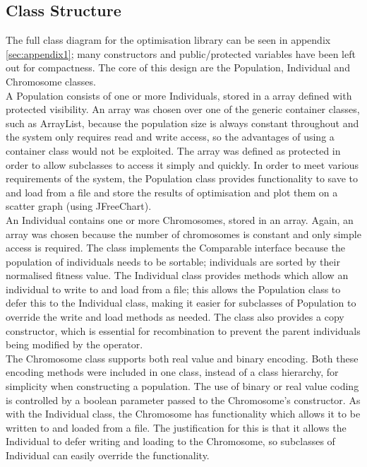 \subsection{Class Structure}
The full class diagram for the optimisation library can be seen in appendix \ref{sec:appendix1}; many constructors and public/protected variables have been left out for compactness. The core of this design are the Population, Individual and Chromosome classes.
\\A Population consists of one or more Individuals, stored in a array defined with protected visibility. An array was chosen over one of the generic container classes, such as ArrayList, because the population size is always constant throughout and the system only requires read and write access, so the advantages of using a container class would not be exploited. The array was defined as protected in order to allow subclasses to access it simply and quickly. In order to meet various requirements of the system, the Population class provides functionality to save to and load from a file and store the results of optimisation and plot them on a scatter graph (using JFreeChart\cite{jfree}). 
\\An Individual contains one or more Chromosomes, stored in an array. Again, an array was chosen because the number of chromosomes is constant and only simple access is required. The class implements the Comparable interface because the population of individuals needs to be sortable; individuals are sorted by their normalised fitness value. The Individual class provides methods which allow an individual to write to and load from a file; this allows the Population class to defer this to the Individual class, making it easier for subclasses of Population to override the write and load methods as needed. The class also provides a copy constructor, which is essential for recombination to prevent the parent individuals being modified by the operator.
\\The Chromosome class supports both real value and binary encoding. Both these encoding methods were included in one class, instead of a class hierarchy, for simplicity when constructing a population. The use of binary or real value coding is controlled by a boolean parameter passed to the Chromosome's constructor. As with the Individual class, the Chromosome has functionality which allows it to be written to and loaded from a file. The justification for this is that it allows the Individual to defer writing and loading to the Chromosome, so subclasses of Individual can easily override the functionality.
